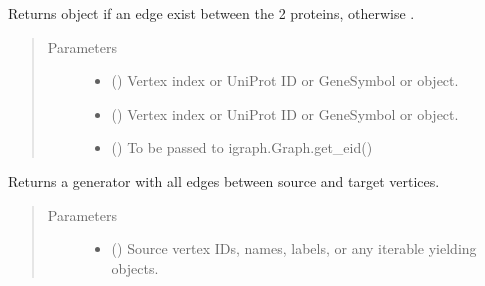 \documentclass[letterpaper,10pt,english]{sphinxmanual}
\begin{document}
\begin{fulllineitems}
\begin{fulllineitems}
\label{\detokenize{main:pypath.main.PyPath.get_edge}}
Returns  object if an edge exist between
the 2 proteins, otherwise .
\begin{quote}\begin{description}
\item[{Parameters}] \leavevmode\begin{itemize}
\item {} 
 (\sphinxstyleliteralemphasis{\sphinxupquote{,}}) \textendash{} Vertex index or UniProt ID or GeneSymbol or 
object.

\item {} 
 (\sphinxstyleliteralemphasis{\sphinxupquote{,}}) \textendash{} Vertex index or UniProt ID or GeneSymbol or 
object.

\item {} 
 () \textendash{} To be passed to igraph.Graph.get\_eid()

\end{itemize}

\end{description}\end{quote}

\end{fulllineitems}


\begin{fulllineitems}
\label{\detokenize{main:pypath.main.PyPath.get_edges}}
Returns a generator with all edges between source and target vertices.
\begin{quote}\begin{description}
\item[{Parameters}] \leavevmode\begin{itemize}
\item {} 
 () \textendash{} Source vertex IDs, names, labels, or any iterable yielding
 objects.


\end{itemize}
\end{description}
\end{quote}
\end{fulllineitems}
\end{fulllineitems}
\end{document}
